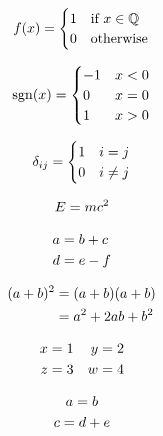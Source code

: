 \documentclass{article}
\newcommand*\pdfcraftbegin[1]{\special{pdfcraft:eq:#1:begin}}
\newcommand*\pdfcraftend[1]{\special{pdfcraft:eq:#1:end}}
\begin{document}
\par
\newpage
\setcounter{equation}{0}
\[\pdfcraftbegin{cases_text}
f(x) = \begin{cases} 1 & \text{if } x \in \mathbb{Q} \\ 0 & \text{otherwise} \end{cases}
\pdfcraftend{cases_text}\]
\par
\newpage
\setcounter{equation}{0}
\[\pdfcraftbegin{cases_sign}
\operatorname{sgn}(x) = \begin{cases} -1 & x < 0 \\ 0 & x = 0 \\ 1 & x > 0 \end{cases}
\pdfcraftend{cases_sign}\]
\par
\newpage
\setcounter{equation}{0}
\begin{equation}\pdfcraftbegin{cases_numbered}
\delta_{ij} = \begin{cases} 1 & i = j \\ 0 & i \ne j \end{cases}
\pdfcraftend{cases_numbered}\end{equation}
\par
\newpage
\setcounter{equation}{0}
\begin{equation}\pdfcraftbegin{equation_numbered}
E = mc^2
\pdfcraftend{equation_numbered}\end{equation}
\par
\newpage
\setcounter{equation}{0}
\begin{align}\pdfcraftbegin{align_two}
a &= b + c \\ d &= e - f
\pdfcraftend{align_two}\end{align}
\par
\newpage
\setcounter{equation}{0}
\begin{align}\pdfcraftbegin{align_chain}
(a+b)^2 &= (a+b)(a+b) \\ &= a^2 + 2ab + b^2
\pdfcraftend{align_chain}\end{align}
\par
\newpage
\setcounter{equation}{0}
\begin{align}\pdfcraftbegin{align_pairs}
x &= 1 & y &= 2 \\ z &= 3 & w &= 4
\pdfcraftend{align_pairs}\end{align}
\par
\newpage
\setcounter{equation}{0}
\begin{gather}\pdfcraftbegin{gather_rows}
a = b \\ c = d + e
\pdfcraftend{gather_rows}\end{gather}
\end{document}
